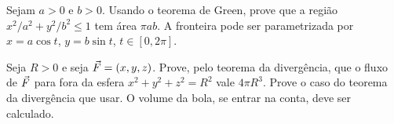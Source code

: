 \documentclass[11pt,a4paper]{article}
\begin{document}
\begin{exercicio}
Sejam $a>0$ e $b>0$. Usando o teorema de Green, prove que a região $x^2/a^2+y^2/b^2\le 1$ tem área $\pi ab$. A fronteira pode ser parametrizada por $x=a\cos t$, $y=b\sin t$, $t\in[0,2\pi]$.
\end{exercicio}
\vspace{8cm}

\begin{exercicio}
Seja $R>0$ e seja $\vec{F}=(x,y,z)$. Prove, pelo teorema da divergência, que o fluxo de $\vec{F}$ para fora da esfera $x^2+y^2+z^2=R^2$ vale $4\pi R^3$. Prove o caso do teorema da divergência que usar. O volume da bola, se entrar na conta, deve ser calculado.
\end{exercicio}
\vspace{8cm}
\end{document}
